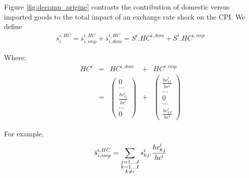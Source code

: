 \documentclass[11pt,a4paper]{article}
\begin{document}
%


Figure \ref{fig:decomp_origine} contrasts the contribution of domestic versus imported goods to the total impact of an exchange rate shock on the CPI.
We define 
\begin{eqnarray}
\overline{s}_i^{i,HC}=\overline{s}_{i,imp}^{i,HC} + \overline{s}_{i,dom}^{i,HC} = S^i.HC^{i,dom}+ S^i.HC^{i,imp}
\label{equ:decomp_impexp}
\end{eqnarray}

Where:
\begin{equation}
\begin{array}{ccccc}
HC^i&=&HC^{i,dom} & + &  HC^{i,imp} \\ 
&=&  \left( \begin{array}{c}
	0 \\
	...\\
	\frac{{hc}_{ij}^i}{hc^i}\\
	...\\
	0
	 \end{array}
	 \right)
&+&
\left( 	\begin{array}{c} \frac{{hc}_{11}^i}{hc^i} \\	...\\0\\...\\\frac{{hc}_{IJ}^i}{hc^i}\end{array}\right) 
\end{array}
\end{equation}

For example,
\begin{equation}
\overline{s}_{i,imp}^{i,HC} = \underset{\begin{subarray}{c}j=1 \dots J   \\ k=1 \dots I \\ k \neq i \end{subarray}}{\mathop \sum}\,{{s}_{kj}^i}.\frac{{hc}_{kj}^i}{hc^i}
\label{equ:share_of_imported}
 \end{equation}
\end{document}
